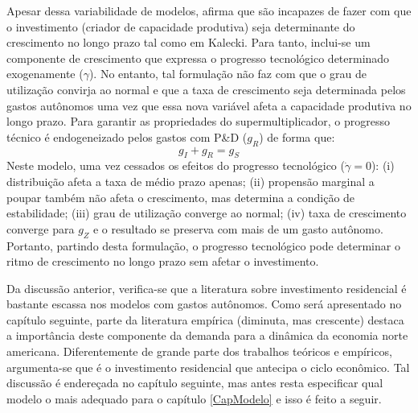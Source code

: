 Apesar dessa variabilidade de modelos, \textcite{dutt_observations_2018} afirma que são incapazes de fazer com que o investimento (criador de capacidade produtiva) seja determinante do crescimento no longo prazo tal como em Kalecki. Para tanto, inclui-se um componente de crescimento que expressa o progresso tecnológico determinado exogenamente ($\gamma$). No entanto, tal formulação não faz com que o grau de utilização convirja ao normal e que a taxa de crescimento seja determinada pelos gastos autônomos uma vez que essa nova variável afeta a capacidade produtiva no longo prazo. Para garantir as propriedades do supermultiplicador, o progresso técnico é endogeneizado pelos gastos com P\&D ($g_R$) de forma que:
$$
g_I + g_R = g_S
$$
Neste modelo, uma vez cessados os efeitos do progresso tecnológico ($\dot \gamma = 0$): 
(i) distribuição afeta a taxa de médio prazo apenas; 
(ii) propensão marginal a poupar também não afeta o crescimento, mas determina a condição de estabilidade; 
(iii) grau de utilização converge ao normal; 
(iv) taxa de crescimento converge para $g_Z$ e o resultado se preserva com mais de um gasto autônomo. Portanto, partindo desta formulação, o progresso tecnológico pode determinar o ritmo de crescimento no longo prazo sem afetar o investimento.


Da discussão anterior, verifica-se que a literatura sobre investimento residencial é bastante escassa nos modelos com gastos autônomos. Como será apresentado no capítulo seguinte, parte da literatura empírica (diminuta, mas crescente) destaca a importância deste componente da demanda para a dinâmica da economia norte americana. Diferentemente de grande parte dos trabalhos teóricos e empíricos, argumenta-se que é o investimento residencial que antecipa o ciclo econômico. Tal discussão é endereçada no capítulo seguinte, mas antes resta especificar qual modelo o mais adequado para o capítulo \ref{CapModelo} e isso é feito a seguir.

